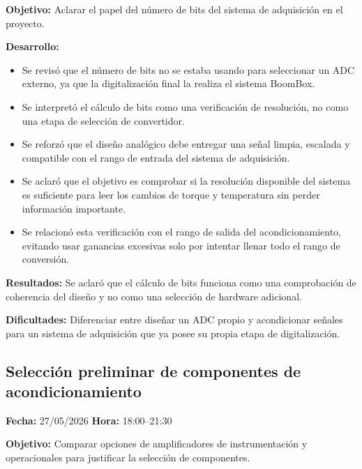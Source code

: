 \documentclass[12pt]{article}
\begin{document}
\textbf{Objetivo:}
Aclarar el papel del número de bits del sistema de adquisición en el proyecto.

\textbf{Desarrollo:}
\begin{itemize}
\item Se revisó que el número de bits no se estaba usando para seleccionar un ADC externo, ya que la digitalización final la realiza el sistema BoomBox.
\item Se interpretó el cálculo de bits como una verificación de resolución, no como una etapa de selección de convertidor.
\item Se reforzó que el diseño analógico debe entregar una señal limpia, escalada y compatible con el rango de entrada del sistema de adquisición.
\item Se aclaró que el objetivo es comprobar si la resolución disponible del sistema es suficiente para leer los cambios de torque y temperatura sin perder información importante.
\item Se relacionó esta verificación con el rango de salida del acondicionamiento, evitando usar ganancias excesivas solo por intentar llenar todo el rango de conversión.
\end{itemize}

\textbf{Resultados:}
Se aclaró que el cálculo de bits funciona como una comprobación de coherencia del diseño y no como una selección de hardware adicional.

\textbf{Dificultades:}
Diferenciar entre diseñar un ADC propio y acondicionar señales para un sistema de adquisición que ya posee su propia etapa de digitalización.

\subsection{Selección preliminar de componentes de acondicionamiento}
\textbf{Fecha:} 27/05/2026 \quad \textbf{Hora:} 18:00--21:30

\textbf{Objetivo:}
Comparar opciones de amplificadores de instrumentación y operacionales para justificar la selección de componentes.
\end{document}
